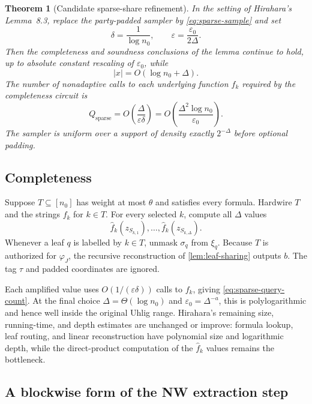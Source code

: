 \documentclass[11pt]{article}
\newtheorem{theorem}{Theorem}[section]
\theoremstyle{definition}
\newcommand{\eps}{\varepsilon}
\begin{document}
\begin{theorem}[Candidate sparse-share refinement]\label{thm:sparse-hirahara}
In the setting of Hirahara's Lemma~8.3, replace the party-padded sampler by \eqref{eq:sparse-sample} and set
\[
 \delta=\frac1{\log n_0},
 \qquad
 \eps=\frac{\eps_0}{2\Delta}.
\]
Then the completeness and soundness conclusions of the lemma continue to hold, up to absolute constant rescaling of $\eps_0$, while
\[
 |x|=O(\log n_0+\Delta).
\]
The number of nonadaptive calls to each underlying function $f_k$ required by the completeness circuit is
\begin{equation}\label{eq:sparse-query-count}
 Q_{\mathrm{sparse}}
 =O\!\left(\frac{\Delta}{\eps\delta}\right)
 =O\!\left(\frac{\Delta^2\log n_0}{\eps_0}\right).
\end{equation}
The sampler is uniform over a support of density exactly $2^{-\Delta}$ before optional padding.
\end{theorem}

\subsection{Completeness}

Suppose $T\subseteq[n_0]$ has weight at most $\theta$ and satisfies every formula.  Hardwire $T$ and the strings $f_k$ for $k\in T$.  For every selected $k$, compute all $\Delta$ values
\[
 \widehat f_k(z_{S_{k,1}}),\ldots,
 \widehat f_k(z_{S_{k,\Delta}}).
\]
Whenever a leaf $q$ is labelled by $k\in T$, unmask $\sigma_q$ from $\xi_q$.  Because $T$ is authorized for $\varphi_J$, the recursive reconstruction of \cref{lem:leaf-sharing} outputs $b$.  The tag $\tau$ and padded coordinates are ignored.

Each amplified value uses $O(1/(\eps\delta))$ calls to $f_k$, giving \eqref{eq:sparse-query-count}.  At the final choice $\Delta=\Theta(\log n_0)$ and $\eps_0=\Delta^{-a}$, this is polylogarithmic and hence well inside the original Uhlig range.  Hirahara's remaining size, running-time, and depth estimates are unchanged or improve: formula lookup, leaf routing, and linear reconstruction have polynomial size and logarithmic depth, while the direct-product computation of the $\widehat f_k$ values remains the bottleneck.

\subsection{A blockwise form of the NW extraction step}
\end{document}
